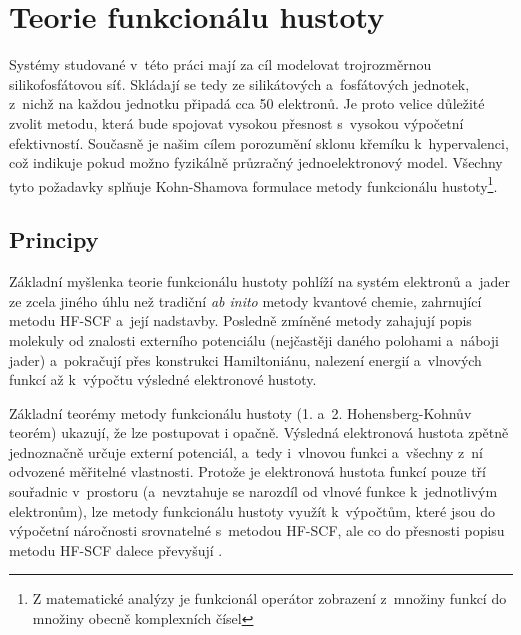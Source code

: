 \documentclass[
digital, %
table,   %
nolof,     %
nolot,     %
oneside,
]{fithesis3}
\begin{document}
\section{Teorie funkcionálu hustoty}
Systémy studované v~této práci mají za cíl modelovat trojrozměrnou silikofosfátovou síť. Skládají se tedy ze silikátových a~fosfátových jednotek, z~nichž na každou jednotku připadá cca 50 elektronů. Je proto velice důležité zvolit metodu, která bude spojovat vysokou přesnost s~vysokou výpočetní efektivností. Současně je našim cílem porozumění sklonu křemíku k~hypervalenci, což indikuje pokud možno fyzikálně průzračný jednoelektronový model. Všechny tyto požadavky splňuje Kohn-Shamova formulace metody funkcionálu hustoty\footnote{Z matematické analýzy je funkcionál operátor zobrazení z~množiny funkcí do množiny obecně komplexních čísel}\cite{Bickelhauptdftreview}.

\subsection{Principy}
Základní myšlenka teorie funkcionálu hustoty pohlíží na systém elektronů a~jader ze zcela jiného úhlu než tradiční \textit{ab inito} metody kvantové chemie, zahrnující metodu HF-SCF a~její nadstavby. Posledně zmíněné metody zahajují popis molekuly od znalosti externího potenciálu (nejčastěji daného polohami a~náboji jader) a~pokračují přes konstrukci Hamiltoniánu, nalezení energií a~vlnových funkcí až k~výpočtu výsledné elektronové hustoty.

Základní teorémy metody funkcionálu hustoty (1. a~2. Hohensberg-Kohnův teorém) ukazují, že lze postupovat i opačně. Výsledná elektronová hustota zpětně jednoznačně určuje externí potenciál, a~tedy i~vlnovou funkci a~všechny z~ní odvozené měřitelné vlastnosti. Protože je elektronová hustota funkcí pouze tří souřadnic v~prostoru (a~nevztahuje se narozdíl od vlnové funkce k~jednotlivým elektronům), lze metody funkcionálu hustoty využít k~výpočtům, které jsou do výpočetní náročnosti srovnatelné s~metodou HF-SCF, ale co do přesnosti popisu metodu HF-SCF dalece převyšují \cite{jensen2007introduction}.\\
\end{document}
